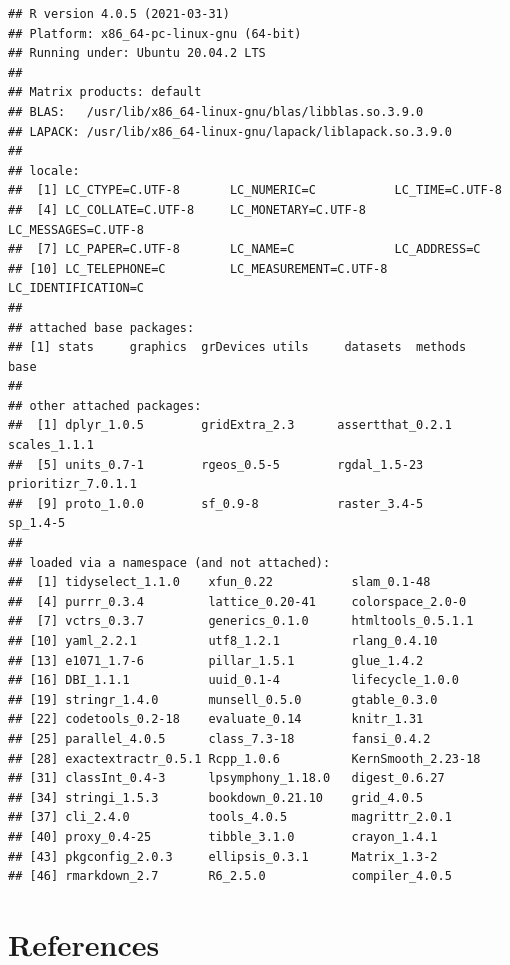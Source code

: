 \documentclass[
  12pt,
]{book}
\begin{document}
\begin{verbatim}
## R version 4.0.5 (2021-03-31)
## Platform: x86_64-pc-linux-gnu (64-bit)
## Running under: Ubuntu 20.04.2 LTS
## 
## Matrix products: default
## BLAS:   /usr/lib/x86_64-linux-gnu/blas/libblas.so.3.9.0
## LAPACK: /usr/lib/x86_64-linux-gnu/lapack/liblapack.so.3.9.0
## 
## locale:
##  [1] LC_CTYPE=C.UTF-8       LC_NUMERIC=C           LC_TIME=C.UTF-8       
##  [4] LC_COLLATE=C.UTF-8     LC_MONETARY=C.UTF-8    LC_MESSAGES=C.UTF-8   
##  [7] LC_PAPER=C.UTF-8       LC_NAME=C              LC_ADDRESS=C          
## [10] LC_TELEPHONE=C         LC_MEASUREMENT=C.UTF-8 LC_IDENTIFICATION=C   
## 
## attached base packages:
## [1] stats     graphics  grDevices utils     datasets  methods   base     
## 
## other attached packages:
##  [1] dplyr_1.0.5        gridExtra_2.3      assertthat_0.2.1   scales_1.1.1      
##  [5] units_0.7-1        rgeos_0.5-5        rgdal_1.5-23       prioritizr_7.0.1.1
##  [9] proto_1.0.0        sf_0.9-8           raster_3.4-5       sp_1.4-5          
## 
## loaded via a namespace (and not attached):
##  [1] tidyselect_1.1.0    xfun_0.22           slam_0.1-48        
##  [4] purrr_0.3.4         lattice_0.20-41     colorspace_2.0-0   
##  [7] vctrs_0.3.7         generics_0.1.0      htmltools_0.5.1.1  
## [10] yaml_2.2.1          utf8_1.2.1          rlang_0.4.10       
## [13] e1071_1.7-6         pillar_1.5.1        glue_1.4.2         
## [16] DBI_1.1.1           uuid_0.1-4          lifecycle_1.0.0    
## [19] stringr_1.4.0       munsell_0.5.0       gtable_0.3.0       
## [22] codetools_0.2-18    evaluate_0.14       knitr_1.31         
## [25] parallel_4.0.5      class_7.3-18        fansi_0.4.2        
## [28] exactextractr_0.5.1 Rcpp_1.0.6          KernSmooth_2.23-18 
## [31] classInt_0.4-3      lpsymphony_1.18.0   digest_0.6.27      
## [34] stringi_1.5.3       bookdown_0.21.10    grid_4.0.5         
## [37] cli_2.4.0           tools_4.0.5         magrittr_2.0.1     
## [40] proxy_0.4-25        tibble_3.1.0        crayon_1.4.1       
## [43] pkgconfig_2.0.3     ellipsis_0.3.1      Matrix_1.3-2       
## [46] rmarkdown_2.7       R6_2.5.0            compiler_4.0.5
\end{verbatim}

\hypertarget{references}{%
\chapter{References}\label{references}}

  
\end{document}
